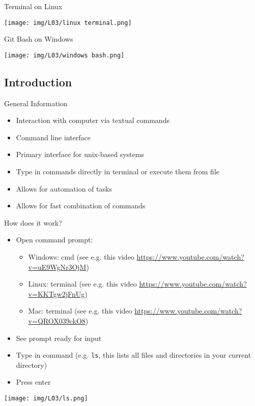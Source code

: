 \documentclass[hyperref={pdfpagelabels=false},aspectratio=169]{beamer}
\begin{document}
\begin{frame}{Terminal on Linux}

    \centering
    \texttt{[image: img/L03/linux terminal.png]}
\end{frame}

\begin{frame}{Git Bash on Windows}

    \centering
    \texttt{[image: img/L03/windows bash.png]}
\end{frame}


\subsection*{Introduction}
\begin{frame}{General Information}
    \begin{itemize}
        \item Interaction with computer via textual commands
        \item Command line interface
        \item Primary interface for unix-based systems
        \item Type in commands directly in terminal or execute them from file
        \item Allows for automation of tasks
        \item Allows for fast combination of commands
    \end{itemize}
\end{frame}

\begin{frame}{How does it work?}

    \begin{itemize}
        \item Open command prompt:
        \begin{itemize}
            \item Windows: cmd (see e.g. this video \url{https://www.youtube.com/watch?v=uE9WgNr3OjM})
            \item Linux: terminal (see e.g. this video \url{https://www.youtube.com/watch?v=KKTgw2jFnUg})
            \item Mac: terminal (see e.g. this video \url{https://www.youtube.com/watch?v=QROX039ckO8})
        \end{itemize}
        \item See prompt ready for input
        \item Type in command (e.g. \texttt{ls}, this lists all files and directories in your current directory)
        \item Press enter
    \end{itemize}
    
    \vspace{5pt}
    \centering
    \texttt{[image: img/L03/ls.png]}
    
\end{frame}
\end{document}
